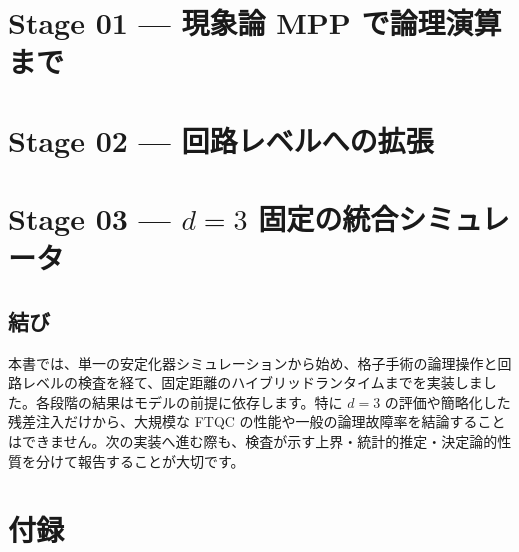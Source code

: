\documentclass[book,openany,lualatex,paper={182mm,232mm},fontsize=10pt,line_length=41zw,number_of_lines=33]{jlreq}
\begin{document}



\part{Stage 01 — 現象論 MPP で論理演算まで}\label{part:stage_01}






\part{Stage 02 — 回路レベルへの拡張}\label{part:stage_02}







\part{Stage 03 — \texorpdfstring{$d=3$}{d=3} 固定の統合シミュレータ}\label{part:stage_03}







\chapter*{結び}
本書では、単一の安定化器シミュレーションから始め、格子手術の論理操作と回路レベルの検査を経て、固定距離のハイブリッドランタイムまでを実装しました。各段階の結果はモデルの前提に依存します。特に $d=3$ の評価や簡略化した残差注入だけから、大規模な FTQC の性能や一般の論理故障率を結論することはできません。次の実装へ進む際も、検査が示す上界・統計的推定・決定論的性質を分けて報告することが大切です。

\appendix
\part{付録}\label{part:appendix}






\backmatter
\end{document}
